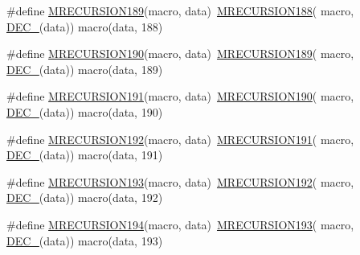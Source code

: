 \begin{DoxyCompactItemize}
\item 
\#define \mbox{\hyperlink{group__group__sam0__utils__mrecursion_ga5853c0c0f3dd91a6a68b624957e45b1f}{M\+R\+E\+C\+U\+R\+S\+I\+O\+N189}}(macro,  data)~\mbox{\hyperlink{group__group__sam0__utils__mrecursion_ga16bf5f92e153fe0044ed33ca46a5b259}{M\+R\+E\+C\+U\+R\+S\+I\+O\+N188}}(  macro, \mbox{\hyperlink{group__group__sam0__utils__mrecursion_ga1d23d683797679dca8c3512a54a5dcae}{D\+E\+C\+\_\+}}(data))   macro(data, 188)
\item 
\#define \mbox{\hyperlink{group__group__sam0__utils__mrecursion_gae01f94ced8dcefc1af77936aec9b55a7}{M\+R\+E\+C\+U\+R\+S\+I\+O\+N190}}(macro,  data)~\mbox{\hyperlink{group__group__sam0__utils__mrecursion_ga5853c0c0f3dd91a6a68b624957e45b1f}{M\+R\+E\+C\+U\+R\+S\+I\+O\+N189}}(  macro, \mbox{\hyperlink{group__group__sam0__utils__mrecursion_ga1d23d683797679dca8c3512a54a5dcae}{D\+E\+C\+\_\+}}(data))   macro(data, 189)
\item 
\#define \mbox{\hyperlink{group__group__sam0__utils__mrecursion_ga6932bbd13a4e01b7042880a747a2f031}{M\+R\+E\+C\+U\+R\+S\+I\+O\+N191}}(macro,  data)~\mbox{\hyperlink{group__group__sam0__utils__mrecursion_gae01f94ced8dcefc1af77936aec9b55a7}{M\+R\+E\+C\+U\+R\+S\+I\+O\+N190}}(  macro, \mbox{\hyperlink{group__group__sam0__utils__mrecursion_ga1d23d683797679dca8c3512a54a5dcae}{D\+E\+C\+\_\+}}(data))   macro(data, 190)
\item 
\#define \mbox{\hyperlink{group__group__sam0__utils__mrecursion_ga51b19514621a674f7708f6b0636ad2be}{M\+R\+E\+C\+U\+R\+S\+I\+O\+N192}}(macro,  data)~\mbox{\hyperlink{group__group__sam0__utils__mrecursion_ga6932bbd13a4e01b7042880a747a2f031}{M\+R\+E\+C\+U\+R\+S\+I\+O\+N191}}(  macro, \mbox{\hyperlink{group__group__sam0__utils__mrecursion_ga1d23d683797679dca8c3512a54a5dcae}{D\+E\+C\+\_\+}}(data))   macro(data, 191)
\item 
\#define \mbox{\hyperlink{group__group__sam0__utils__mrecursion_ga646ecde91e6819ac487b0b8f7bc6a7c1}{M\+R\+E\+C\+U\+R\+S\+I\+O\+N193}}(macro,  data)~\mbox{\hyperlink{group__group__sam0__utils__mrecursion_ga51b19514621a674f7708f6b0636ad2be}{M\+R\+E\+C\+U\+R\+S\+I\+O\+N192}}(  macro, \mbox{\hyperlink{group__group__sam0__utils__mrecursion_ga1d23d683797679dca8c3512a54a5dcae}{D\+E\+C\+\_\+}}(data))   macro(data, 192)
\item 
\#define \mbox{\hyperlink{group__group__sam0__utils__mrecursion_ga68e422a9d4d85b27a7c8b4fb415266d4}{M\+R\+E\+C\+U\+R\+S\+I\+O\+N194}}(macro,  data)~\mbox{\hyperlink{group__group__sam0__utils__mrecursion_ga646ecde91e6819ac487b0b8f7bc6a7c1}{M\+R\+E\+C\+U\+R\+S\+I\+O\+N193}}(  macro, \mbox{\hyperlink{group__group__sam0__utils__mrecursion_ga1d23d683797679dca8c3512a54a5dcae}{D\+E\+C\+\_\+}}(data))   macro(data, 193)

\end{DoxyCompactItemize}
